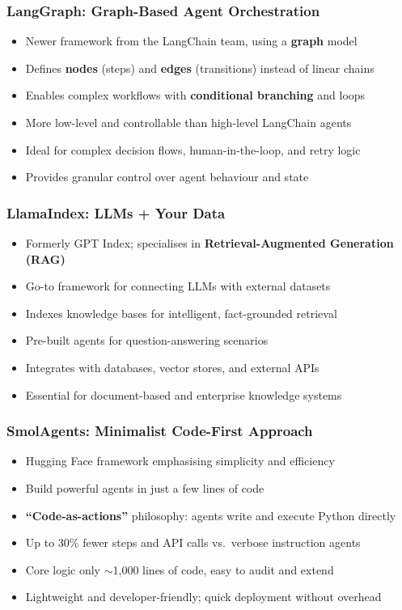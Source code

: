 \begin{frame}[fragile]\frametitle{LangGraph: Graph-Based Agent Orchestration}
      \begin{itemize}
	  \item Newer framework from the LangChain team, using a \textbf{graph} model
	  \item Defines \textbf{nodes} (steps) and \textbf{edges} (transitions) instead of linear chains
	  \item Enables complex workflows with \textbf{conditional branching} and loops
	  \item More low-level and controllable than high-level LangChain agents
	  \item Ideal for complex decision flows, human-in-the-loop, and retry logic
	  \item Provides granular control over agent behaviour and state
	  \end{itemize}
\end{frame}

\begin{frame}[fragile]\frametitle{LlamaIndex: LLMs + Your Data}
      \begin{itemize}
	  \item Formerly GPT Index; specialises in \textbf{Retrieval-Augmented Generation (RAG)}
	  \item Go-to framework for connecting LLMs with external datasets
	  \item Indexes knowledge bases for intelligent, fact-grounded retrieval
	  \item Pre-built agents for question-answering scenarios
	  \item Integrates with databases, vector stores, and external APIs
	  \item Essential for document-based and enterprise knowledge systems
	  \end{itemize}
\end{frame}

\begin{frame}[fragile]\frametitle{SmolAgents: Minimalist Code-First Approach}
      \begin{itemize}
	  \item Hugging Face framework emphasising simplicity and efficiency
	  \item Build powerful agents in just a few lines of code
	  \item \textbf{``Code-as-actions''} philosophy: agents write and execute Python directly
	  \item Up to 30\% fewer steps and API calls vs.\ verbose instruction agents
	  \item Core logic only $\sim$1{,}000 lines of code, easy to audit and extend
	  \item Lightweight and developer-friendly; quick deployment without overhead
	  \end{itemize}
\end{frame}

